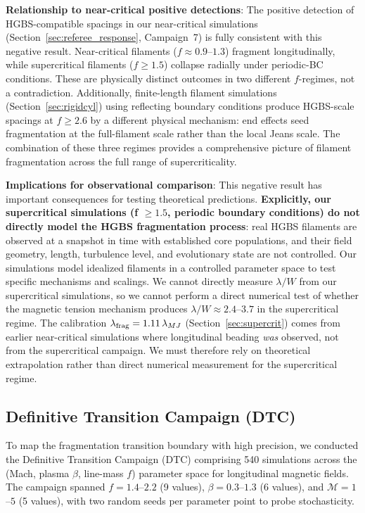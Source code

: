 \documentclass[twoside,twocolumn]{mnras}
\begin{document}
\textbf{Relationship to near-critical positive detections}: The positive detection of HGBS-compatible spacings in our near-critical simulations (Section~\ref{sec:referee_response}, Campaign~7) is fully consistent with this negative result. Near-critical filaments ($f \approx 0.9$--$1.3$) fragment longitudinally, while supercritical filaments ($f \geq 1.5$) collapse radially under periodic-BC conditions. These are physically distinct outcomes in two different $f$-regimes, not a contradiction. Additionally, finite-length filament simulations (Section~\ref{sec:rigidcyl}) using reflecting boundary conditions produce HGBS-scale spacings at $f \geq 2.6$ by a different physical mechanism: end effects seed fragmentation at the full-filament scale rather than the local Jeans scale. The combination of these three regimes provides a comprehensive picture of filament fragmentation across the full range of supercriticality.

\textbf{Implications for observational comparison}: This negative result has important consequences for testing theoretical predictions. \textbf{Explicitly, our supercritical simulations (f $\geq 1.5$, periodic boundary conditions) do not directly model the HGBS fragmentation process}: real HGBS filaments are observed at a snapshot in time with established core populations, and their field geometry, length, turbulence level, and evolutionary state are not controlled. Our simulations model idealized filaments in a controlled parameter space to test specific mechanisms and scalings. We cannot directly measure $\lambda/W$ from our supercritical simulations, so we cannot perform a direct numerical test of whether the magnetic tension mechanism produces $\lambda/W \approx 2.4$--$3.7$ in the supercritical regime. The calibration $\lambda_{\rm frag} = 1.11\,\lambda_{MJ}$ (Section~\ref{sec:supercrit}) comes from earlier near-critical simulations where longitudinal beading \textit{was} observed, not from the supercritical campaign. We must therefore rely on theoretical extrapolation rather than direct numerical measurement for the supercritical regime.

\subsection{Definitive Transition Campaign (DTC)}
\label{sec:dtc}

To map the fragmentation transition boundary with high precision, we conducted the Definitive Transition Campaign (DTC) comprising 540 simulations across the (Mach, plasma $\beta$, line-mass $f$) parameter space for longitudinal magnetic fields. The campaign spanned $f = 1.4$--$2.2$ (9 values), $\beta = 0.3$--$1.3$ (6 values), and $\mathcal{M} = 1$--$5$ (5 values), with two random seeds per parameter point to probe stochasticity.
\end{document}
